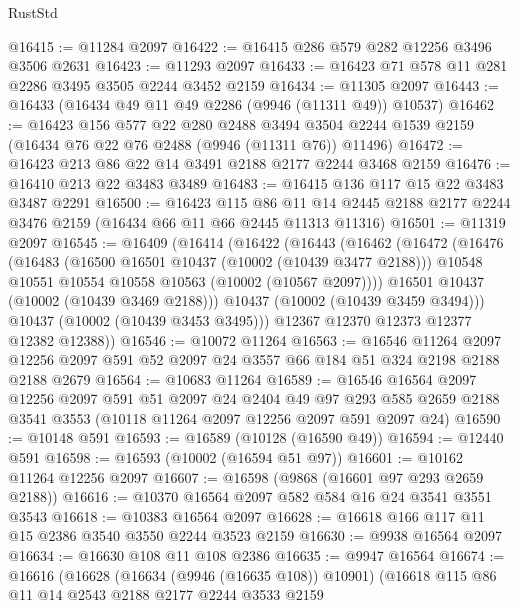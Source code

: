 \begin{lexlean}{RustStd}
\begin{coremodule}
@16415 := @11284 @2097
@16422 := @16415 @286 @579 @282 @12256 @3496 @3506 @2631
@16423 := @11293 @2097
@16433 := @16423 @71 @578 @11 @281 @2286 @3495 @3505 @2244 @3452 @2159
@16434 := @11305 @2097
@16443 := @16433 (@16434 @49 @11 @49 @2286 (@9946 (@11311 @49)) @10537)
@16462 := @16423
    @156
    @577
    @22
    @280
    @2488
    @3494
    @3504
    @2244
    @1539
    @2159
    (@16434 @76 @22 @76 @2488 (@9946 (@11311 @76)) @11496)
@16472 := @16423 @213 @86 @22 @14 @3491 @2188 @2177 @2244 @3468 @2159
@16476 := @16410 @213 @22 @3483 @3489
@16483 := @16415 @136 @117 @15 @22 @3483 @3487 @2291
@16500 := @16423
    @115
    @86
    @11
    @14
    @2445
    @2188
    @2177
    @2244
    @3476
    @2159
    (@16434 @66 @11 @66 @2445 @11313 @11316)
@16501 := @11319 @2097
@16545 := @16409
    (@16414
      (@16422
        (@16443
          (@16462
            (@16472
              (@16476
                (@16483
                  (@16500 @16501 @10437 (@10002 (@10439 @3477 @2188)))
                  @10548
                  @10551
                  @10554
                  @10558
                  @10563
                  (@10002 (@10567 @2097))))
              @16501
              @10437
              (@10002 (@10439 @3469 @2188)))
            @10437
            (@10002 (@10439 @3459 @3494)))
          @10437
          (@10002 (@10439 @3453 @3495)))
        @12367
        @12370
        @12373
        @12377
        @12382
        @12388))
@16546 := @10072 @11264
@16563 := @16546
    @11264
    @2097
    @12256
    @2097
    @591
    @52
    @2097
    @24
    @3557
    @66
    @184
    @51
    @324
    @2198
    @2188
    @2188
    @2679
@16564 := @10683 @11264
@16589 := @16546
    @16564
    @2097
    @12256
    @2097
    @591
    @51
    @2097
    @24
    @2404
    @49
    @97
    @293
    @585
    @2659
    @2188
    @3541
    @3553
    (@10118 @11264 @2097 @12256 @2097 @591 @2097 @24)
@16590 := @10148 @591
@16593 := @16589 (@10128 (@16590 @49))
@16594 := @12440 @591
@16598 := @16593 (@10002 (@16594 @51 @97))
@16601 := @10162 @11264 @12256 @2097
@16607 := @16598 (@9868 (@16601 @97 @293 @2659 @2188))
@16616 := @10370 @16564 @2097 @582 @584 @16 @24 @3541 @3551 @3543
@16618 := @10383 @16564 @2097
@16628 := @16618 @166 @117 @11 @15 @2386 @3540 @3550 @2244 @3523 @2159
@16630 := @9938 @16564 @2097
@16634 := @16630 @108 @11 @108 @2386
@16635 := @9947 @16564
@16674 := @16616
    (@16628
      (@16634 (@9946 (@16635 @108)) @10901)
      (@16618
        @115
        @86
        @11
        @14
        @2543
        @2188
        @2177
        @2244
        @3533
        @2159

\end{coremodule}
\end{lexlean}
